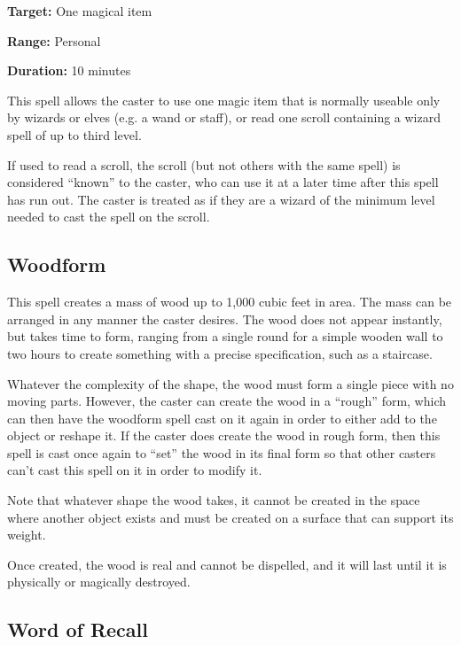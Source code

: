 \begin{multicols*}{2}
{\textbf{Target:} One magical item

\textbf{Range:} Personal

\textbf{Duration:} 10 minutes}

This spell allows the caster to use one magic item that is normally useable only by wizards or elves (e.g. a wand or staff), or read one scroll containing a wizard spell of up to third level.

If used to read a scroll, the scroll (but not others with the same spell) is considered “known” to the caster, who can use it at a later time after this spell has run out. The caster is treated as if they are a wizard of the minimum level needed to cast the spell on the scroll.

\subsection{Woodform}\label{spell:Woodform}

This spell creates a mass of wood up to 1,000 cubic feet in area. The mass can be arranged in any manner the caster desires. The wood does not appear instantly, but takes time to form, ranging from a single round for a simple wooden wall to two hours to create something with a precise specification, such as a staircase.

Whatever the complexity of the shape, the wood must form a single piece with no moving parts. However, the caster can create the wood in a “rough” form, which can then have the woodform spell cast on it again in order to either add to the object or reshape it. If the caster does create the wood in rough form, then this spell is cast once again to “set” the wood in its final form so that other casters can’t cast this spell on it in order to modify it.

Note that whatever shape the wood takes, it cannot be created in the space where another object exists and must be created on a surface that can support its weight.

Once created, the wood is real and cannot be dispelled, and it will last until it is physically or magically destroyed.

\subsection{Word of Recall}\label{spell:Word of Recall}
\end{multicols*}
